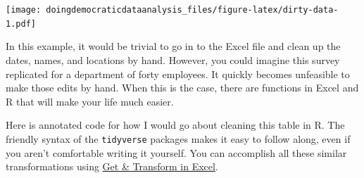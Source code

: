 \documentclass[
]{book}
\begin{document}
\texttt{[image: doingdemocraticdataanalysis\_files/figure-latex/dirty-data-1.pdf]}

In this example, it would be trivial to go in to the Excel file and clean up the dates, names, and locations by hand. However, you could imagine this survey replicated for a department of forty employees. It quickly becomes unfeasible to make those edits by hand. When this is the case, there are functions in Excel and R that will make your life much easier.

Here is annotated code for how I would go about cleaning this table in R. The friendly syntax of the \texttt{tidyverse} packages makes it easy to follow along, even if you aren't comfortable writing it yourself. You can accomplish all these similar transformations using \href{https://support.microsoft.com/en-us/office/power-query-101-008b3f46-5b14-4f8b-9a07-d3da689091b5}{Get \& Transform in Excel}.
\end{document}
